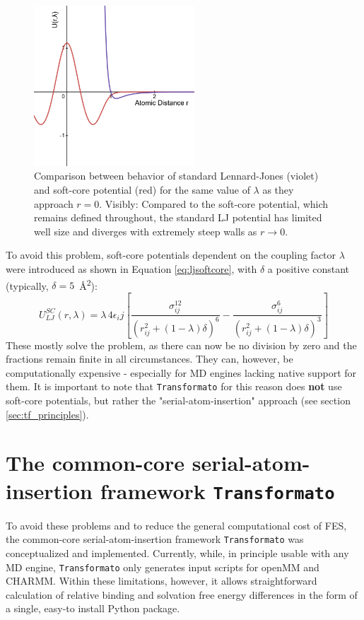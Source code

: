 \documentclass[oneside]{scrreprt}
\begin{document}
\begin{figure}
    \centering
    \includegraphics[height=6cm]{plots/LJandsoftcore.png}
    \caption[Comparison between behavior of standard LJ potentials vs. soft-core potentials]{Comparison between behavior of standard Lennard-Jones (violet) and soft-core potential (red) for the same value of $\lambda$ as they approach $r=0$. Visibly: Compared to the soft-core potential, which remains defined throughout, the standard LJ potential has limited well size and diverges with extremely steep walls as $r\to 0$.}
    \label{fig:ljandsoftcore}
\end{figure}

To avoid this problem, soft-core potentials dependent on the coupling factor $\lambda$ were introduced as shown in Equation \ref{eq:ljsoftcore}\cite{boresch_avoiding_2011}, with $\delta$ a positive constant (typically, $\delta=5$~\AA\textsuperscript{2}):
\begin{equation}
U_{LJ}^{SC}(r,\lambda)=\lambda\,4\epsilon_ij \left[\frac{\sigma_{ij}^{12}}{(r^2_{ij}+(1-\lambda)\delta)^6}-\frac{\sigma_{ij}^6}{(r^2_{ij}+(1-\lambda)\delta)^3} \right]
\label{eq:ljsoftcore}
\end{equation}
These mostly solve the problem, as there can now be no division by zero and the fractions remain finite in all circumstances. They can, however, be computationally expensive  - especially for MD engines lacking native support for them\cite{Li2020Aug}. It is important to note that \texttt{Transformato} for this reason does \textbf{not} use soft-core potentials, but rather the "serial-atom-insertion" approach (see section \ref{sec:tf_principles}).


\section{The common-core serial-atom-insertion framework {\texttt{Transformato}}}
To avoid these problems and to reduce the general computational cost of FES, the common-core serial-atom-insertion framework \texttt{Transformato} was conceptualized and implemented\cite{karwounopoulos_relative_2022,braunsfeldImplementationTestingCHARMM,Wieder2022Jun}. 
Currently, while, in principle usable with any MD engine, \texttt{Transformato}  only generates input scripts for openMM\cite{Eastman2017Jul} and CHARMM\cite{Brooks2009Jul}. Within these limitations, however, it allows straightforward calculation of relative binding and solvation free energy differences in the form of a single, easy-to install Python package.
\end{document}
